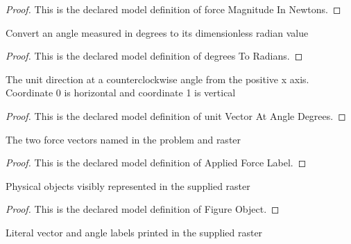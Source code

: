 \begin{proof}
  This is the declared model definition of force Magnitude In Newtons.
\end{proof}
\begin{definition}
  \label{def:physics:phyx-mini-0677:phyxminiproblems-problemphyxmini0677-degreestoradians}
  Convert an angle measured in degrees to its dimensionless radian value
\end{definition}
\begin{proof}
  This is the declared model definition of degrees To Radians.
\end{proof}
\begin{definition}
  \label{def:physics:phyx-mini-0677:phyxminiproblems-problemphyxmini0677-unitvectoratangledegrees}
  The unit direction at a counterclockwise angle from the positive x axis. Coordinate 0 is horizontal and coordinate 1 is vertical
\end{definition}
\begin{proof}
  This is the declared model definition of unit Vector At Angle Degrees.
\end{proof}
\begin{definition}
  \label{def:physics:phyx-mini-0677:phyxminiproblems-problemphyxmini0677-appliedforcelabel}
  The two force vectors named in the problem and raster
\end{definition}
\begin{proof}
  This is the declared model definition of Applied Force Label.
\end{proof}
\begin{definition}
  \label{def:physics:phyx-mini-0677:phyxminiproblems-problemphyxmini0677-figureobject}
  Physical objects visibly represented in the supplied raster
\end{definition}
\begin{proof}
  This is the declared model definition of Figure Object.
\end{proof}
\begin{definition}
  \label{def:physics:phyx-mini-0677:phyxminiproblems-problemphyxmini0677-figurelabel}
  Literal vector and angle labels printed in the supplied raster
\end{definition}
